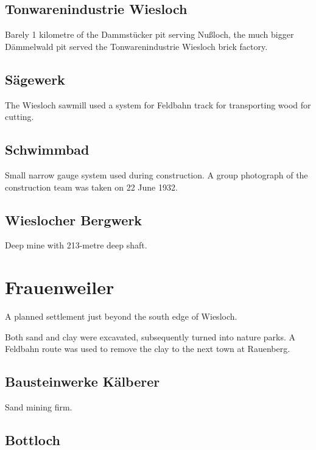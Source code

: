 \documentclass[a4paper]{report}
\begin{document}
\subsection{Tonwarenindustrie Wiesloch}

Barely 1 kilometre of the Dammstücker pit serving Nußloch, the much
bigger Dämmelwald pit served the Tonwarenindustrie Wiesloch brick
factory.

\subsection{Sägewerk}

The Wiesloch sawmill used a system for Feldbahn track for transporting wood for cutting.

\subsection{Schwimmbad}

Small narrow gauge system used during construction.  A group
photograph of the construction team was taken on 22 June
1932.\cite[p.107]{Kurz-Mohr-1996}

\subsection{Wieslocher Bergwerk}

Deep mine with 213-metre deep shaft.\cite[p.49]{Kurz-Mohr-1996}

\section{Frauenweiler}

A planned settlement just beyond the south edge of Wiesloch.

Both sand and clay were excavated, subsequently turned into nature
parks.\cite{Hildebrandt-75-2012} A Feldbahn route was used to remove
the clay to the next town at Rauenberg.\cite{Rothenhoefer-bott-2016}

\subsection{Bausteinwerke Kälberer}

Sand mining firm.

\subsection{Bottloch}
\end{document}
